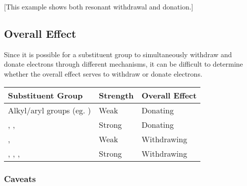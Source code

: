 			[This example shows both resonant withdrawal and donation.]




		\subsection{Overall Effect}

			Since it is possible for a substituent group to simultaneously withdraw and donate electrons through different
			mechanisms, it can be difficult to determine whether the overall effect serves to withdraw or donate electrons.

			\begin{table}[htb]\renewcommand{\arraystretch}{1.5}\begin{center}
			\begin{tabu} to 0.9\textwidth { X[4,c,m] | X[c,m] | X[c,m] }

				Substituent Group                           &   Strength    &   Overall Effect  \\ \hline

				Alkyl/aryl groups (eg. )           &   Weak        &   Donating        \\
				, ,              &   Strong      &   Donating        \\
				\ch{-\Cl},                          &   Weak        &   Withdrawing     \\
				, , ,   &   Strong      &   Withdrawing     \\

			\end{tabu}\end{center}
			\end{table}\vspace{-1em}

			\subsubsection{Caveats}
			\hypertarget{CaveatResonanceTable}{}

